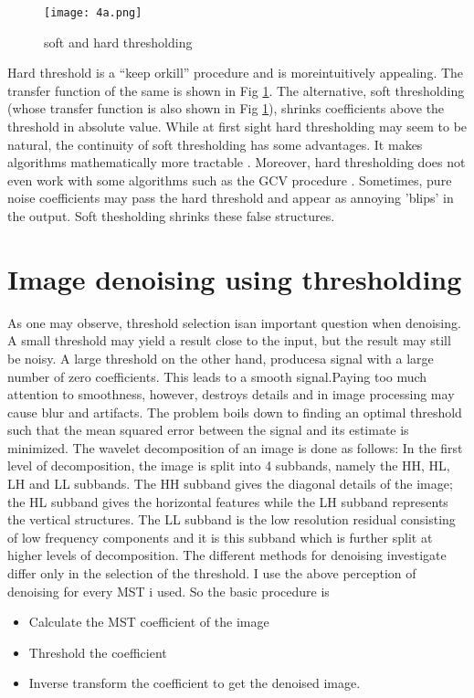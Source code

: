 \begin{figure}[h!]
  \centering
  \texttt{[image: 4a.png]}
  \caption{soft and hard thresholding} \label{tsr}
\end{figure}

Hard threshold is a “keep orkill” procedure and is moreintuitively appealing. The transfer function of the same is shown in Fig \ref{tsr}. The alternative, soft thresholding  
(whose transfer function is also shown in Fig \ref{tsr}), shrinks coefficients above the threshold in absolute value. While at first sight hard thresholding may seem to be natural, the continuity of soft thresholding has some advantages. It makes algorithms  mathematically more tractable \cite{23}. Moreover, hard thresholding does not even work with some algorithms such as the GCV procedure . Sometimes, pure noise 
coefficients may pass the hard threshold and appear as annoying ’blips’ in the output. Soft thesholding shrinks these false structures. 

\section{Image denoising using thresholding}
As one may observe, threshold selection isan important question when denoising. A small threshold may yield a result close to the input, but the result may still be noisy.   A 
large threshold on the other hand, producesa signal with a large number of zero coefficients.   This leads to a smooth signal.Paying too much attention to smoothness, however, destroys details and in image processing may cause blur and artifacts. \hfill \break
The problem boils down to finding an optimal threshold such that the mean squared error  between the signal and its estimate is minimized. The wavelet decomposition of an 
image is done as follows: In the first level of decomposition, the image is split into 4 subbands, namely the HH, HL, LH and LL subbands. The HH subband gives the diagonal details of the image; the HL subband gives the horizontal features while the LH subband represents the vertical structures. The LL subband is the low resolution residual consisting of low frequency components and it is this subband which is further  split at higher levels of decomposition.  The different methods for denoising investigate differ only in the selection of the threshold. \hfill \break
I use the above perception of denoising for every MST i used.
So the basic procedure is 
\begin{itemize}
\item Calculate the MST coefficient of the image
\item Threshold the coefficient
\item Inverse transform the coefficient to get the denoised image.
\end{itemize}

